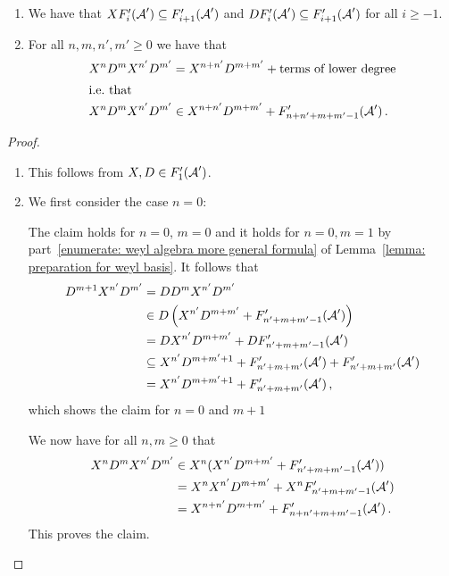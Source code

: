 \begin{lemma}
  \label{lemma: two monomonial commute up to smaller degree}
  \leavevmode
  \begin{enumerate}
    \item
      We have that $X F'_i(\operatorname{\mathcal{A}}') \subseteq F'_{i+1}(\operatorname{\mathcal{A}}')$ and $D F'_i(\operatorname{\mathcal{A}}') \subseteq F'_{i+1}(\operatorname{\mathcal{A}}')$ for all $i \geq -1$.
    \item
      For all $n, m, n', m' \geq 0$ we have that
      \begin{align*}
              X^n D^m X^{n'} D^{m'}
        &=    X^{n+n'} D^{m+m'} + \text{terms of lower degree}  \\
    \shortintertext{i.e.\ that}
              X^n D^m X^{n'} D^{m'}
        &\in  X^{n+n'} D^{m+m'} + F'_{n+n'+m+m'-1}(\operatorname{\mathcal{A}}') \,.
      \end{align*}
  \end{enumerate}
\end{lemma}


\begin{proof}
  \leavevmode
  \begin{enumerate}
    \item
      This follows from $X, D \in F'_1(\operatorname{\mathcal{A}}')$.
    \item
      We first consider the case $n = 0$:
      
      The claim holds for $n = 0$, $m = 0$ and it holds for $n = 0, m = 1$ by part~\ref*{enumerate: weyl algebra more general formula} of Lemma~\ref{lemma: preparation for weyl basis}.
      It follows that
      \begin{align*}
                    D^{m+1} X^{n'} D^{m'}
        &=          D D^{m} X^{n'} D^{m'}                                         \\
        &\in        D \left( X^{n'} D^{m+m'} + F'_{n'+m+m'-1}(\operatorname{\mathcal{A}}') \right)    \\
        &=          D X^{n'} D^{m+m'} + D F'_{n'+m+m'-1}(\operatorname{\mathcal{A}}')                 \\
        &\subseteq    X^{n'} D^{m+m'+1}
                    + F'_{n'+m+m'}(\operatorname{\mathcal{A}}')
                    + F'_{n'+m+m'}(\operatorname{\mathcal{A}}')                                       \\
        &=            X^{n'} D^{m+m'+1}
                    + F'_{n'+m+m'}(\operatorname{\mathcal{A}}') \,,
      \end{align*}
      which shows the claim for $n = 0$ and $m+1$
      
      We now have for all $n, m \geq 0$ that
      \begin{align*}
              X^n D^m X^{n'} D^{m'}
        &\in  X^n ( X^{n'} D^{m + m'} + F'_{n' + m + m' - 1}(\operatorname{\mathcal{A}}') )  \\
        &=    X^n X^{n'} D^{m + m'} + X^n F'_{n' + m + m'- 1}(\operatorname{\mathcal{A}}')   \\
        &=    X^{n + n'} D^{m + m'} + F'_{n + n' + m + m' - 1}(\operatorname{\mathcal{A}}')  \,.
      \end{align*}
      This proves the claim.
    \qedhere
  \end{enumerate}
\end{proof}


